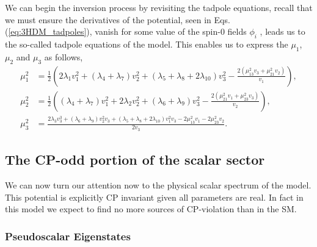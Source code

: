 \documentclass[10pt]{book}
\renewcommand{\(}{\left(}
\renewcommand{\)}{\right)}
\renewcommand{\[}{\left[}
\renewcommand{\]}{\right]}
\begin{document}
We can begin the inversion process by revisiting the tadpole equations, recall that we must ensure the derivatives of the potential, seen in Eqs.\,(\ref{eq:3HDM_tadpoles}), vanish for some value of the spin-0 fields $\phi_i$ , leads us to the so-called tadpole equations of the model. This enables us to express the $\mu_1$, $\mu_2$ and $\mu_3$ as follows, 
%
\begin{equation}
\label{eq:3HDM_Param_1}
\begin{split}
%
\mu _1^2& =\frac{1}{2} \left(2 \lambda _1 v_1^2+\left(\lambda _4+\lambda _7\right) v_2^2+\left(\lambda _5+\lambda _8+2 \lambda _{10}\right) v_3^2-\frac{2 \left(\mu _{13}^2 v_3+\mu _{21}^2
   v_2\right)}{v_1}\right) , \\ 
%
\mu _2^2 & =\frac{1}{2} \left(\left(\lambda _4+\lambda _7\right) v_1^2+2 \lambda _2 v_2^2+\left(\lambda _6+\lambda _9\right) v_3^2-\frac{2 \left(\mu _{21}^2 v_1+\mu _{23}^2 v_3\right)}{v_2}\right)  , \\ 
% 
\mu _3^2 & =\frac{2 \lambda _3 v_3^3+\left(\lambda _6+\lambda _9\right) v_2^2 v_3+\left(\lambda _5+\lambda _8+2 \lambda _{10}\right) v_1^2 v_3-2 \mu _{13}^2 v_1-2 \mu _{23}^2 v_2}{2 v_3} . 
\end{split}  
\end{equation}

\subsection{The CP-odd portion of the scalar sector}

We can now turn our attention now to the physical scalar spectrum of the model. 
%
This potential is explicitly CP invariant given all parameters are real.
%
In fact in this model we expect to find no more sources of CP-violation than in the SM. 

\subsubsection{Pseudoscalar Eigenstates}
\end{document}
